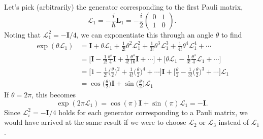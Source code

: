 \documentclass[../road-to-reality.tex]{subfiles}
\begin{document}
\begin{questions}
\begin{solution}
	Let's pick (arbitrarily) the generator corresponding to the first Pauli matrix,
	\[
		\mathcal{L}_1 = -\frac{i}{\hbar}\mathbf{L}_1 = -\frac{i}{2}\begin{pmatrix}0 & 1 \\ 1 & 0\end{pmatrix}.
	\]
	Noting that $\mathcal{L}_1^2 = -\mathbf{I}/4$, we can exponentiate this through an angle $\theta$ to find
	\begin{align*}
		\exp(\theta\mathcal{L}_1) &= \mathbf{I} + \theta\mathcal{L}_1 + \frac{1}{2!}\theta^2\mathcal{L}_1^2 + \frac{1}{3!}\theta^3\mathcal{L}_1^3 + \frac{1}{4!}\theta^4\mathcal{L}_1^4 + \cdots \\
		&= \Big[\mathbf{I} - \frac{1}{2!}\frac{\theta^2}{4}\mathbf{I} + \frac{1}{4!}\frac{\theta^4}{16}\mathbf{I} + \cdots\Big] + \Big[\theta\mathcal{L}_1 - \frac{1}{3!}\frac{\theta^3}{4}\mathcal{L}_1 + \cdots\Big] \\
		&= \Big[1 - \frac{1}{2!}\Big(\frac{\theta}{2}\Big)^2 + \frac{1}{4!}\Big(\frac{\theta}{2}\Big)^4 + \cdots\Big]\mathbf{I} + \Big[\frac{\theta}{2} - \frac{1}{3!}\Big(\frac{\theta}{2}\Big)^3 + \cdots\Big]\mathcal{L}_1 \\
		&= \cos\Big(\frac{\theta}{2}\Big)\mathbf{I} + \sin\Big(\frac{\theta}{2}\Big)\mathcal{L}_1
	\end{align*}
	If $\theta=2\pi$, this becomes
	\[
		\exp(2\pi\mathcal{L}_1) = \cos(\pi)\mathbf{I} + \sin(\pi)\mathcal{L}_1 = -\mathbf{I}.
	\]
	Since $\mathcal{L}_i^2 = -\mathbf{I}/4$ holds for each generator corresponding to a Pauli matrix, we would have arrived at the same result if we were to choose $\mathcal{L}_2$ or $\mathcal{L}_3$ instead of $\mathcal{L}_1$.
\end{solution}

\end{questions}
	
\end{document}
